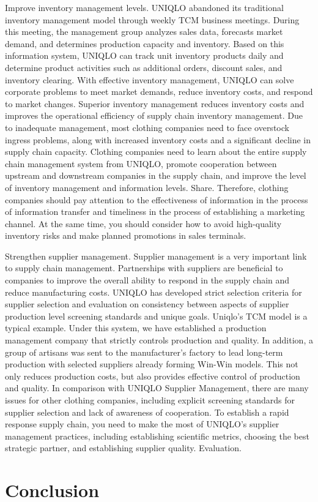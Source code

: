 \documentclass[]{article}
\begin{document}
Improve inventory management levels. UNIQLO abandoned its traditional
inventory management model through weekly TCM business meetings. During
this meeting, the management group analyzes sales data, forecasts market
demand, and determines production capacity and inventory. Based on this
information system, UNIQLO can track unit inventory products daily and
determine product activities such as additional orders, discount sales,
and inventory clearing. With effective inventory management, UNIQLO can
solve corporate problems to meet market demands, reduce inventory costs,
and respond to market changes. Superior inventory management reduces
inventory costs and improves the operational efficiency of supply chain
inventory management. Due to inadequate management, most clothing
companies need to face overstock ingress problems, along with increased
inventory costs and a significant decline in supply chain capacity.
Clothing companies need to learn about the entire supply chain
management system from UNIQLO, promote cooperation between upstream and
downstream companies in the supply chain, and improve the level of
inventory management and information levels. Share. Therefore, clothing
companies should pay attention to the effectiveness of information in
the process of information transfer and timeliness in the process of
establishing a marketing channel. At the same time, you should consider
how to avoid high-quality inventory risks and make planned promotions in
sales terminals.

Strengthen supplier management. Supplier management is a very important
link to supply chain management. Partnerships with suppliers are
beneficial to companies to improve the overall ability to respond in the
supply chain and reduce manufacturing costs. UNIQLO has developed strict
selection criteria for supplier selection and evaluation on consistency
between aspects of supplier production level screening standards and
unique goals. Uniqlo's TCM model is a typical example. Under this
system, we have established a production management company that
strictly controls production and quality. In addition, a group of
artisans was sent to the manufacturer's factory to lead long-term
production with selected suppliers already forming Win-Win models. This
not only reduces production costs, but also provides effective control
of production and quality. In comparison with UNIQLO Supplier
Management, there are many issues for other clothing companies,
including explicit screening standards for supplier selection and lack
of awareness of cooperation. To establish a rapid response supply chain,
you need to make the most of UNIQLO's supplier management practices,
including establishing scientific metrics, choosing the best strategic
partner, and establishing supplier quality. Evaluation.

\hypertarget{conclusion}{%
\section{Conclusion}\label{conclusion}}
\end{document}
